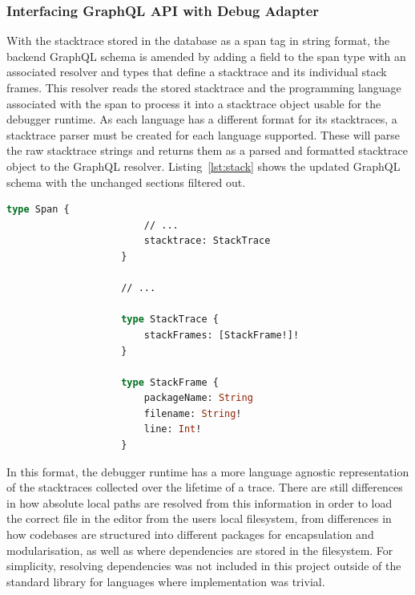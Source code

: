 \documentclass[12pt,pdftex,titlepage]{report}
\begin{document}
                \subsubsection{Interfacing GraphQL API with Debug Adapter}
                    With the stacktrace stored in the database as a span tag in string format, the backend GraphQL schema is amended by adding a field to the span type with an associated resolver and 
                    types that define a stacktrace and its individual stack frames. This resolver reads the stored stacktrace and the programming language associated with the span to process it into a 
                    stacktrace object usable for the debugger runtime. As each language has a different format for its stacktraces, a stacktrace parser must be created for each language supported. These
                    will parse the raw stacktrace strings and returns them as a parsed and formatted stacktrace object to the GraphQL resolver. Listing~\ref{lst:stack} shows the updated GraphQL schema
                    with the unchanged sections filtered out. 

                \bigskip
                \begin{lstlisting}[caption={GraphQL schema updated with stack- trace and frame objects, unchanged fields and objects filtered.}, language=GraphQL, gobble=20, label={lst:stack}]
                    type Span {
                        // ...
                        stacktrace: StackTrace
                    }

                    // ...

                    type StackTrace {
                        stackFrames: [StackFrame!]!
                    }

                    type StackFrame {
                        packageName: String
                        filename: String!
                        line: Int!
                    }
                \end{lstlisting}
                \bigskip

                In this format, the debugger runtime has a more language agnostic representation of the stacktraces collected over the lifetime of a trace. There are still differences
                in how absolute local paths are resolved from this information in order to load the correct file in the editor from the users local filesystem, from differences in how
                codebases are structured into different packages for encapsulation and modularisation, as well as where dependencies are stored in the filesystem. For simplicity, 
                resolving dependencies was not included in this project outside of the standard library for languages where implementation was trivial.
\end{document}
